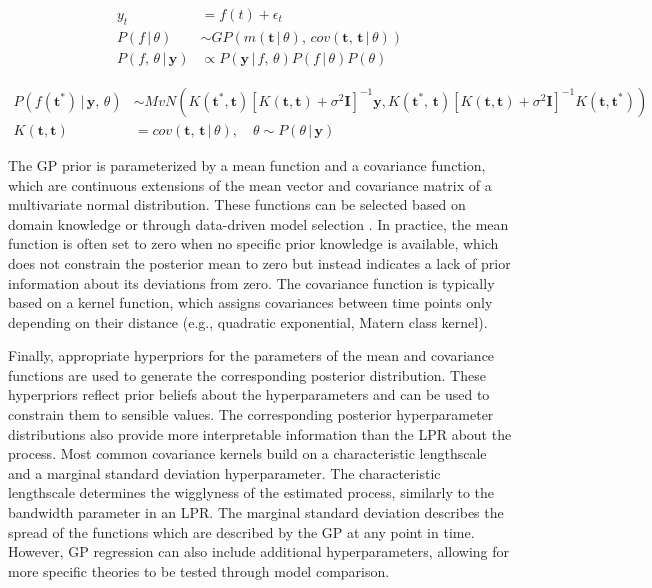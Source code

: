 \documentclass[man, floatsintext]{apa7}
\begin{document}
\begin{equation}\label{eq:gp_equations}
  \begin{aligned}
    y_t                                & = f(t) + \epsilon_t
    \\
    P(f \, | \, \theta)                & \sim GP(m(\textbf{t} \, | \, \theta),
    \,
    cov(\textbf{t}, \, \textbf{t} \, | \, \theta ))
    \\
    P(f, \, \theta \, | \, \textbf{y}) & \propto P(\textbf{y} \, | \, f, \,
    \theta ) P(f \, | \, \theta) P(\theta)
  \end{aligned}
\end{equation}

\begin{equation}
  \begin{aligned}
    P(f(\textbf{t}^*) \, | \, \textbf{y} , \, \theta) & \sim
    MvN(K(\textbf{t}^*, \textbf{t}){[K(\textbf{t}, \textbf{t}) + \sigma^2
            \textbf{I}]}^{-1}\textbf{y}, K(\textbf{t}^*, \,
    \textbf{t}){[K(\textbf{t}, \textbf{t}) + \sigma^2
            \textbf{I}]}^{-1} K(\textbf{t}, \textbf{t}^*))
    \\
    K(\textbf{t}, \textbf{t})                         & = cov(\textbf{t}, \,
    \textbf{t} \, | \, \theta), \quad \theta \sim P(\theta \, | \, \textbf{y})
  \end{aligned}
\end{equation}

The GP prior is parameterized by a mean function and a covariance function,
which are continuous extensions of the mean vector and covariance matrix of a
multivariate normal distribution. These functions can be selected based on
domain knowledge or through data-driven model selection
\parencite{richardson_gaussian_2017, abdessalem_automatic_2017}. In practice,
the mean function is often set to zero when no specific prior knowledge is
available, which does not constrain the posterior mean to zero but instead
indicates a lack of prior information about its deviations from zero.
The covariance function is typically based on a kernel function, which assigns
covariances between time points only depending on their distance
(e.g., quadratic exponential, Matern class kernel).

Finally, appropriate
hyperpriors for the parameters of the mean and covariance functions are used
to generate the corresponding posterior distribution. These hyperpriors reflect
prior beliefs about the hyperparameters and can be used to constrain them to
sensible values. The corresponding posterior hyperparameter distributions
also provide more interpretable information than the LPR about the process.
Most common covariance kernels build on a
characteristic lengthscale and a marginal standard deviation hyperparameter.
The characteristic lengthscale determines the wigglyness of the estimated
process, similarly to the bandwidth parameter in an LPR\@. The marginal
standard deviation describes the spread of the functions which are described
by the GP at any point in time. However, GP regression can also
include additional hyperparameters, allowing for more specific theories to be
tested through model comparison.
\end{document}
